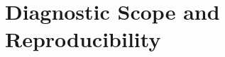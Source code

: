 \documentclass[11pt]{article}
\begin{document}



\FloatBarrier
\appendix
\section{Diagnostic Scope and Reproducibility}
\label{sec:withdrawal_diagnostics}
\end{document}
